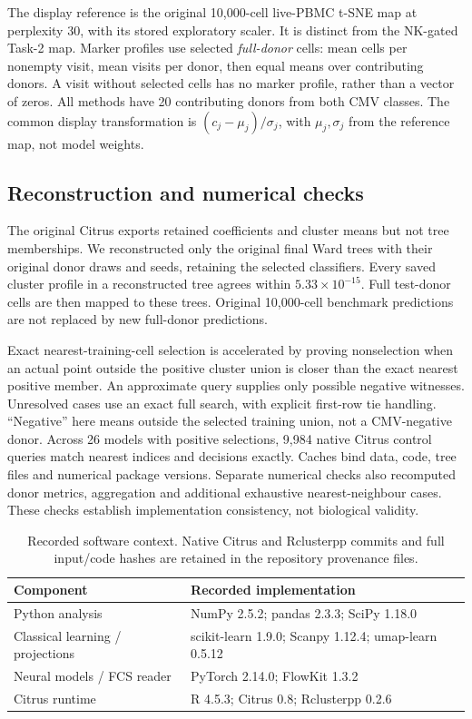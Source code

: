 \documentclass[11pt,a4paper]{article}
\begin{document}
The display reference is the original 10,000-cell live-PBMC t-SNE map at perplexity 30, with its stored exploratory scaler. It is distinct from the NK-gated Task-2 map. Marker profiles use selected \emph{full-donor} cells: mean cells per nonempty visit, mean visits per donor, then equal means over contributing donors. A visit without selected cells has no marker profile, rather than a vector of zeros. All methods have 20 contributing donors from both CMV classes. The common display transformation is $(c_j-\mu_j)/\sigma_j$, with $\mu_j,\sigma_j$ from the reference map, not model weights.

\subsection{Reconstruction and numerical checks}
The original Citrus exports retained coefficients and cluster means but not tree memberships. We reconstructed only the original final Ward trees with their original donor draws and seeds, retaining the selected classifiers. Every saved cluster profile in a reconstructed tree agrees within $5.33\times10^{-15}$. Full test-donor cells are then mapped to these trees. Original 10,000-cell benchmark predictions are not replaced by new full-donor predictions.

Exact nearest-training-cell selection is accelerated by proving nonselection when an actual point outside the positive cluster union is closer than the exact nearest positive member. An approximate query supplies only possible negative witnesses. Unresolved cases use an exact full search, with explicit first-row tie handling. ``Negative'' here means outside the selected training union, not a CMV-negative donor. Across 26 models with positive selections, 9,984 native Citrus control queries match nearest indices and decisions exactly. Caches bind data, code, tree files and numerical package versions. Separate numerical checks also recomputed donor metrics, aggregation and additional exhaustive nearest-neighbour cases. These checks establish implementation consistency, not biological validity.

\begin{table}[htb]\centering\small
\begin{tabular}{@{}ll@{}}\toprule
Component & Recorded implementation\\\midrule
Python analysis & NumPy 2.5.2; pandas 2.3.3; SciPy 1.18.0\\
Classical learning / projections & scikit-learn 1.9.0; Scanpy 1.12.4; umap-learn 0.5.12\\
Neural models / FCS reader & PyTorch 2.14.0; FlowKit 1.3.2\\
Citrus runtime & R 4.5.3; Citrus 0.8; Rclusterpp 0.2.6\\\bottomrule
\end{tabular}
\caption{Recorded software context. Native Citrus and Rclusterpp commits and full input/code hashes are retained in the repository provenance files.}
\end{table}
\end{document}
